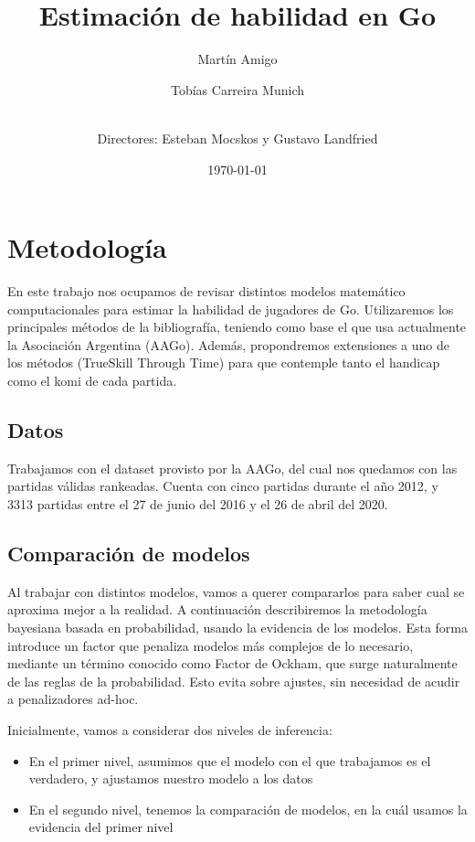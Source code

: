 \documentclass[a4paper,10pt]{report}
\title{Estimaci\'on de habilidad en Go}
\author[a]{Martín Amigo}
\author[a]{Tobías Carreira Munich}
\author[a]{\\ \vspace{0.3cm} \normalsize Directores: Esteban Mocskos y Gustavo Landfried}
\date{\today}
\affil[a]{\small Universidad de Buenos Aires. Facultad de Ciencias Exactas y Naturales. Departamento de Computaci\'on. Buenos Aires, Argentina}
\begin{document}
\maketitle

\section*{Metodología}

En este trabajo nos ocupamos de revisar distintos modelos matemático computacionales para estimar la habilidad de jugadores de Go.
Utilizaremos los principales métodos de la bibliografía, teniendo como base el que usa actualmente la Asociación Argentina (AAGo).
Además, propondremos extensiones a uno de los métodos (TrueSkill Through Time) para que contemple tanto el handicap como el komi de cada partida.

\subsection*{Datos}

Trabajamos con el dataset provisto por la AAGo, del cual nos quedamos con las partidas válidas rankeadas. Cuenta con cinco partidas durante el año 2012, y 3313 partidas entre el 27 de junio del 2016 y el 26 de abril del 2020. 

\subsection*{Comparación de modelos}

Al trabajar con distintos modelos, vamos a querer compararlos para saber cual se aproxima mejor a la realidad.
A continuación describiremos la metodolog\'ia bayesiana basada en probabilidad, usando la evidencia de los modelos.
Esta forma introduce un factor que penaliza modelos m\'as complejos de lo necesario, mediante un t\'ermino conocido como Factor de Ockham, que surge naturalmente de las reglas de la probabilidad.
Esto evita sobre ajustes, sin necesidad de acudir a penalizadores ad-hoc.

Inicialmente, vamos a considerar dos niveles de inferencia:

\begin{itemize}
	\item En el primer nivel, asumimos que el modelo con el que trabajamos es el verdadero, y ajustamos nuestro modelo a los datos
	\item En el segundo nivel, tenemos la comparaci\'on de modelos, en la cu\'al usamos la evidencia del primer nivel
\end{itemize}
\end{document}

